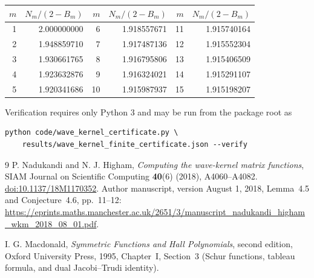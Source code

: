 \documentclass[11pt]{article}
\theoremstyle{remark}\newtheorem{remark}[theorem]{Remark}
\begin{document}
\begin{center}
\begin{tabular}{@{}rrrrrr@{}}\toprule
$m$ & $N_m/(2-B_m)$ & $m$ & $N_m/(2-B_m)$ & $m$ & $N_m/(2-B_m)$\\\midrule
1 & 2.000000000 & 6 & 1.918557671 & 11 & 1.915740164\\
2 & 1.948859710 & 7 & 1.917487136 & 12 & 1.915552304\\
3 & 1.930661765 & 8 & 1.916795806 & 13 & 1.915406509\\
4 & 1.923632876 & 9 & 1.916324021 & 14 & 1.915291107\\
5 & 1.920341686 & 10 & 1.915987937 & 15 & 1.915198207\\\bottomrule
\end{tabular}
\end{center}

Verification requires only Python 3 and may be run from the package root as
\begin{verbatim}
python code/wave_kernel_certificate.py \
    results/wave_kernel_finite_certificate.json --verify
\end{verbatim}

\begin{thebibliography}{9}
P. Nadukandi and N. J. Higham,
\emph{Computing the wave-kernel matrix functions},
SIAM Journal on Scientific Computing \textbf{40}(6) (2018), A4060--A4082.
\href{https://doi.org/10.1137/18M1170352}{doi:10.1137/18M1170352}.
Author manuscript, version August 1, 2018, Lemma~4.5 and Conjecture~4.6, pp.~11--12:
\url{https://eprints.maths.manchester.ac.uk/2651/3/manuscript_nadukandi_higham_wkm_2018_08_01.pdf}.

I. G. Macdonald,
\emph{Symmetric Functions and Hall Polynomials},
second edition, Oxford University Press, 1995, Chapter~I, Section~3
(Schur functions, tableau formula, and dual Jacobi--Trudi identity).
\end{thebibliography}
\end{document}

